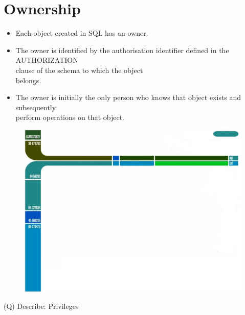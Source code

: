 \documentclass[12pt]{article}
\begin{document}
\section{Ownership}
\begin{itemize}
  \item Each object created in SQL has an owner.
  \item The owner is identified by the authorisation 
identifier defined in the AUTHORIZATION \\
clause of the schema to which the object \\
belongs.\\
  \item The owner is initially the only person who 
knows that object exists and subsequently \\
perform operations on that object.\\
\end{itemize}
\begin{figure}[H]
\includegraphics[width=0.5\linewidth]{page19-image-1.png}
\end{figure}
\clearpage
(Q)
Describe: Privileges
\\ 
 \\
\end{document}
